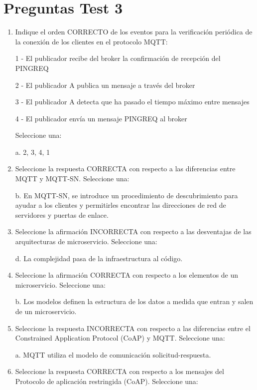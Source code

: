 \documentclass[12pt, twoside, openright]{report} %
\begin{document}
\section{Preguntas Test 3}
\begin{enumerate}
	\item Indique el orden CORRECTO de los eventos para la verificación periódica de la conexión de los clientes en el protocolo MQTT:

	      1 - El publicador recibe del broker la confirmación de recepción del PINGREQ

	      2 - El publicador A publica un mensaje a través del broker

	      3 - El publicador A detecta que ha pasado el tiempo máximo entre mensajes

	      4 - El publicador envía un mensaje PINGREQ al broker

	      Seleccione una:

	      a. 2, 3, 4, 1

	\item Seleccione la respuesta CORRECTA con respecto a las diferencias entre MQTT y MQTT-SN. Seleccione una:

	      b. En MQTT-SN, se introduce un procedimiento de descubrimiento para ayudar a los clientes y permitirles encontrar las direcciones de red de servidores y puertas de enlace.

	\item Seleccione la afirmación INCORRECTA con respecto a las desventajas de las arquitecturas de microservicio. Seleccione una:

	      d. La complejidad pasa de la infraestructura al código.

	\item Seleccione la afirmación CORRECTA con respecto a los elementos de un microservicio. Seleccione una:

	      b. Los modelos definen la estructura de los datos a medida que entran y salen de un microservicio.

	\item Seleccione la respuesta INCORRECTA con respecto a las diferencias entre el Constrained Application Protocol (CoAP) y MQTT.
	      Seleccione una:

	      a. MQTT utiliza el modelo de comunicación solicitud-respuesta.

	\item Seleccione la respuesta CORRECTA con respecto a los mensajes del Protocolo de aplicación restringida (CoAP). Seleccione una:


\end{enumerate}
\end{document}

